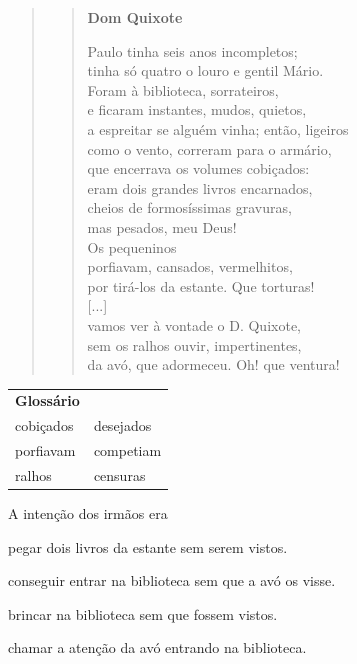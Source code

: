 \begin{quote}
\begin{verse}
\textbf{Dom Quixote}

Paulo tinha seis anos incompletos;\\
tinha só quatro o louro e gentil Mário.\\
Foram à biblioteca, sorrateiros,\\
e ficaram instantes, mudos, quietos,\\
a espreitar se alguém vinha; então, ligeiros\\
como o vento, correram para o armário,\\
que encerrava os volumes cobiçados:\\
eram dois grandes livros encarnados,\\
cheios de formosíssimas gravuras,\\
mas pesados, meu Deus!\\
Os pequeninos\\
porfiavam, cansados, vermelhitos,\\
por tirá-los da estante. Que torturas!\\
{[}...{]}\\
vamos ver à vontade o D. Quixote,\\
sem os ralhos ouvir, impertinentes,\\
da avó, que adormeceu. Oh! que ventura!
\end{verse}

\end{quote}

\begin{tabular}{ll}
\textbf{Glossário} & \mbox{}\\
cobiçados & desejados\\
porfiavam & competiam\\
ralhos & censuras\\
\end{tabular}

A intenção dos irmãos era

\begin{escolha}
\item pegar dois livros da estante sem serem vistos.

\item conseguir entrar na biblioteca sem que a avó os visse.

\item brincar na biblioteca sem que fossem vistos.

\item chamar a atenção da avó entrando na biblioteca.
\end{escolha}

